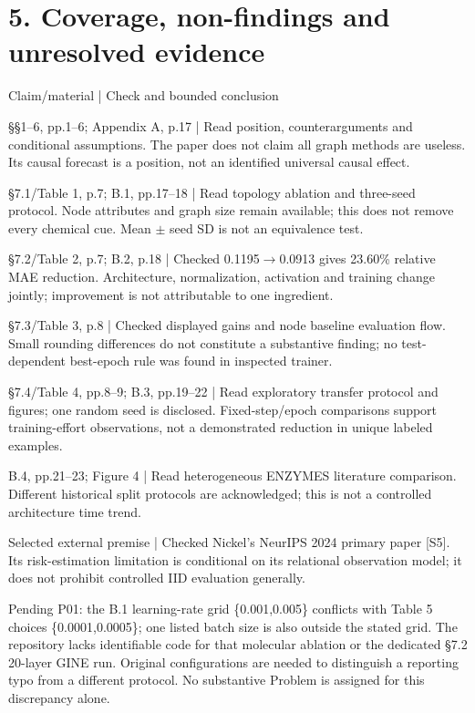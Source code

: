 \documentclass[10pt]{article}
\begin{document}
\section*{5. Coverage, non-findings and unresolved evidence}
Claim/material | Check and bounded conclusion\par
§§1–6, pp.1–6; Appendix A, p.17 | Read position, counterarguments and conditional assumptions. The paper does not claim all graph methods are useless. Its causal forecast is a position, not an identified universal causal effect.\par
§7.1/Table 1, p.7; B.1, pp.17–18 | Read topology ablation and three-seed protocol. Node attributes and graph size remain available; this does not remove every chemical cue. Mean \(\pm\) seed SD is not an equivalence test.\par
§7.2/Table 2, p.7; B.2, p.18 | Checked 0.1195\(\to\)0.0913 gives 23.60\% relative MAE reduction. Architecture, normalization, activation and training change jointly; improvement is not attributable to one ingredient.\par
§7.3/Table 3, p.8 | Checked displayed gains and node baseline evaluation flow. Small rounding differences do not constitute a substantive finding; no test-dependent best-epoch rule was found in inspected trainer.\par
§7.4/Table 4, pp.8–9; B.3, pp.19–22 | Read exploratory transfer protocol and figures; one random seed is disclosed. Fixed-step/epoch comparisons support training-effort observations, not a demonstrated reduction in unique labeled examples.\par
B.4, pp.21–23; Figure 4 | Read heterogeneous ENZYMES literature comparison. Different historical split protocols are acknowledged; this is not a controlled architecture time trend.\par
Selected external premise | Checked Nickel’s NeurIPS 2024 primary paper [S5]. Its risk-estimation limitation is conditional on its relational observation model; it does not prohibit controlled IID evaluation generally.\par
Pending P01: the B.1 learning-rate grid \{0.001,0.005\} conflicts with Table 5 choices \{0.0001,0.0005\}; one listed batch size is also outside the stated grid. The repository lacks identifiable code for that molecular ablation or the dedicated §7.2 20-layer GINE run. Original configurations are needed to distinguish a reporting typo from a different protocol. No substantive Problem is assigned for this discrepancy alone.\par
\end{document}
